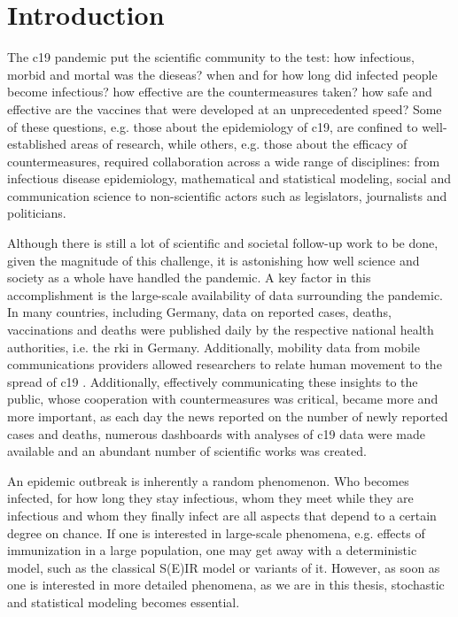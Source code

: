 \chapter{Introduction}

The \gls{c19} pandemic put the scientific community to the test: how infectious, morbid and mortal was the dieseas? when and for how long did infected people become infectious? how effective are the countermeasures taken? how safe and effective are the vaccines that were developed at an unprecedented speed? Some of these questions, e.g. those about the epidemiology of \acrshort{c19}, are confined to well-established areas of research, while others, e.g. those about the efficacy of countermeasures, required collaboration across a wide range of disciplines: from infectious disease epidemiology, mathematical and statistical modeling, social and communication science to non-scientific actors such as legislators, journalists and politicians.

Although there is still a lot of scientific and societal follow-up work to be done, given the magnitude of this challenge, it is astonishing how well science and society as a whole have handled the pandemic. A key factor in this accomplishment is the large-scale availability of data surrounding the pandemic. In many countries, including Germany, data on reported cases, deaths, vaccinations and deaths were published daily by the respective national health authorities, i.e. the \gls{rki} \cite{RobertKoch-Institut2022SARSCoV2,RobertKoch-Institut2021COVID19Hospitalisierungen} in Germany. Additionally, mobility data from mobile communications providers allowed researchers to relate human movement to the spread of \acrshort{c19} \cite{Kraemer2020Effect,Schlosser2020COVID19}. 
Additionally, effectively communicating these insights to the public, whose cooperation with countermeasures was critical, became more and more important, as each day the news reported on the number of newly reported cases and deaths, numerous dashboards with analyses of \acrshort{c19} data were made available and an abundant number of scientific works was created. 

An epidemic outbreak is inherently a random phenomenon. Who becomes infected, for how long they stay infectious, whom they meet while they are infectious and whom they finally infect are all aspects that depend to a certain degree on chance. If one is interested in large-scale phenomena, e.g. effects of immunization in a large population, one may get away with a deterministic model, such as the classical S(E)IR model \cite{Kermack1927Contribution} or variants of it. However, as soon as one is interested in more detailed phenomena, as we are in this thesis, stochastic and statistical modeling becomes essential. 

